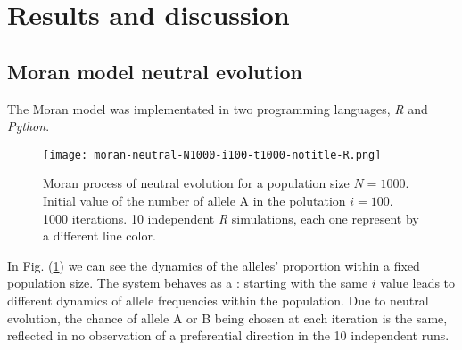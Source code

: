 \documentclass[12pt]{article}
\begin{document}
\section{Results and discussion}

\subsection{Moran model neutral evolution}
\indent The Moran model was implementated in two programming languages, \textit{R} and \textit{Python}. 

\begin{figure}[H]
    \centering
    \texttt{[image: moran-neutral-N1000-i100-t1000-notitle-R.png]}
    \caption{Moran process of neutral evolution for a population size $N = 1000$. Initial value of the number of allele A in the polutation $i = 100$. 1000 iterations. 10 independent \textit{R} simulations, each one represent by a different line color.}
    \label{fig:moran-neutral}
\end{figure}

\indent In Fig. (\ref{fig:moran-neutral}) we can see the dynamics of the alleles' proportion within a fixed population size. The system behaves as a : starting with the same $i$ value leads to different dynamics of allele frequencies within the population. Due to neutral evolution, the chance of allele A or B being chosen at each iteration is the same, reflected in no observation of a preferential direction in the 10 independent runs.
\end{document}
